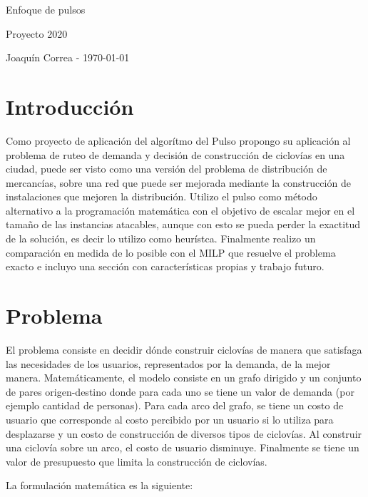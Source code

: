 \documentclass{article}
\begin{document}
  \begin{center}
    {\sc \large Enfoque de pulsos}
    
    {\sc \large Proyecto 2020}
    \linebreak

    {\rm Joaquín Correa - \today}
  \end{center}

  \section*{Introducción}

  Como proyecto de aplicación del algorítmo del Pulso propongo su aplicación al problema de ruteo de demanda y decisión de construcción de ciclovías en una ciudad, puede ser visto como una versión del problema de distribución de mercancías, sobre una red que puede ser mejorada mediante la construcción de instalaciones que mejoren la distribución. Utilizo el pulso como método alternativo a la programación matemática con el objetivo de escalar mejor en el tamaño de las instancias atacables, aunque con esto se pueda perder la exactitud de la solución, es decir lo utilizo como heurístca. Finalmente realizo un comparación en medida de lo posible con el MILP que resuelve el problema exacto e incluyo una sección con características propias y trabajo futuro.

  \section*{Problema}

  El problema consiste en decidir dónde construir ciclovías de manera que satisfaga las necesidades de los usuarios, representados por la demanda, de la mejor manera. Matemáticamente, el modelo consiste en un grafo dirigido y un conjunto de pares origen-destino donde para cada uno se tiene un valor de demanda (por ejemplo cantidad de personas). Para cada arco del grafo, se tiene un costo de usuario que corresponde al costo percibido por un usuario si lo utiliza para desplazarse y un costo de construcción de diversos tipos de ciclovías. Al construir una ciclovía sobre un arco, el costo de usuario disminuye. Finalmente se tiene un valor de presupuesto que limita la construcción de ciclovías.

  La formulación matemática es la siguiente:
\end{document}
